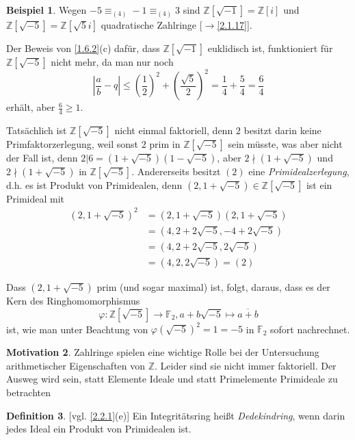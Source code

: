 \documentclass[
twoside=semi,
fontsize=12,
DIV=12, 
cleardoublepage=current,
leqno,
headings=optiontoheadandtoc, 
toc=idx
]{scrbook}
\newcommand{\Z}{\mathbb{Z}}
\newcommand{\F}{\mathbb{F}}
\newcommand{\brac}[1]{\left( #1 \right)}
\theoremstyle{definition}
\newtheorem{definition}{Definition}[section]
\newtheorem{beispiel}[definition]{Beispiel}
\newtheorem{motivation}[definition]{Motivation}
\begin{document}
 	\begin{beispiel}\label{2.2.2}
 		Wegen $-5 \equiv_{(4)} -1 \equiv_{(4)} 3$ sind $\Z[\sqrt{-1}] = \Z[i]$ und $\Z[\sqrt{-5}] = \Z[\sqrt{5}i]$ quadratische Zahlringe [$\to$\ref{2.1.17}].
 		
 		Der Beweis von \ref{1.6.2}(c) daf\"ur, dass $\Z[\sqrt{-1}]$ euklidisch ist, funktioniert f\"ur $\Z[\sqrt{-5}]$ nicht mehr, da man nur noch 
 			\[\left| \frac{a}{b} - q\right| \leq \brac{\frac{1}{2}}^2 + \brac{\frac{\sqrt{5}}{2}}^2 = \frac{1}{4} + \frac{5}{4} = \frac{6}{4}\]
 		erh\"alt, aber $\frac{6}{4} \geq 1$. 
 		
 		Tats\"achlich ist $\Z[\sqrt{-5}]$ nicht einmal faktoriell, denn $2$ besitzt darin keine Primfaktorzerlegung, weil sonst $2$ prim in $\Z[\sqrt{-5}]$ sein m\"usste, was aber nicht der Fall
 		ist, denn $2|6 = (1+\sqrt{-5})(1-\sqrt{-5})$, aber $2\nmid (1+\sqrt{-5})$ und $2 \nmid (1+\sqrt{-5})$ in $\Z[\sqrt{-5}]$. Andererseits besitzt $(2)$ eine \emph{Primidealzerlegung}, d.h. es ist Produkt von Primidealen, denn $(2,1+\sqrt{-5}) \in \Z[\sqrt{-5}]$ ist ein Primideal mit 
 		\begin{align*}
 			(2,1+\sqrt{-5})^2 &= (2,1+\sqrt{-5})(2,1+\sqrt{-5})\\
 			&= (4, 2 + 2\sqrt{-5}, -4 + 2\sqrt{-5})\\
 			&= (4, 2+2\sqrt{-5},2\sqrt{-5})\\
 			&= (4,2,2\sqrt{-5}) = (2)
 		\end{align*}
 	
 		Dass $(2,1+\sqrt{-5})$ prim (und sogar maximal) ist, folgt, daraus, dass es der Kern des Ringhomomorphismus
 			\[\varphi:\Z[\sqrt{-5}]\to \F_2, a+b\sqrt{-5} \mapsto \overline{a+b}\]
 		ist, wie man unter Beachtung von $\varphi(\sqrt{-5})^2 = 1 = -5$ in $\F_2$ sofort nachrechnet.
 	\end{beispiel}
 
 	\begin{motivation}\label{2.2.3}
 		Zahlringe spielen eine wichtige Rolle bei der Untersuchung arithmetischer Eigenschaften von $\Z$. Leider sind sie nicht immer faktoriell. Der Ausweg wird sein, statt Elemente Ideale und statt Primelemente Primideale zu betrachten
 	\end{motivation}
 
 	\begin{definition}\label{2.2.4}
 		[vgl. \ref{2.2.1}(e)]
 		Ein Integrit\"atsring hei\ss t \emph{Dedekindring}, wenn darin jedes Ideal ein Produkt von Primidealen ist.
 	\end{definition}
 
\end{document}
